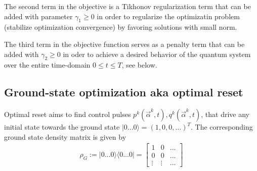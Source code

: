 \documentclass[11pt]{article}
\begin{document}
The second term in the objective is a Tikhonov regularization term that can be added with parameter $\gamma_1\geq 0$ in order to regularize the optimizatin problem (stabilize optimization convergence) by favoring solutions with small norm. 

The third term in the objective function serves as a penalty term that can be added with $\gamma_2 \geq 0$ in oder to achieve a desired behavior of the quantum system over the entire time-domain $0\leq t\leq T$, see below. 


\subsection{Ground-state optimization aka optimal
reset}\label{sec:groundstate-obj}
Optimal reset aims to find control pulses $p^k(\vec{\alpha}^k, t), q^k(\vec{\alpha}^k, t)$,
that drive any initial state towards the ground state $|0\dots 0\rangle = (1, 0,
0, \dots )^T$. The corresponding ground state density matrix is given by
\begin{align}
  \rho_{G} := |0\dots 0\rangle \langle 0 \dots 0 | = 
  \begin{bmatrix} 1      & 0      &  \dots   \\ 
                  0      & 0      &  \dots  \\ 
                  \vdots & \vdots &  \dots 
  \end{bmatrix}
\end{align}
\end{document}
